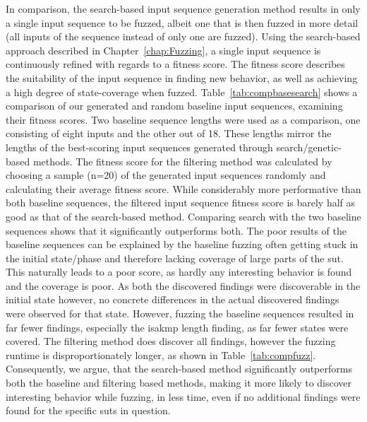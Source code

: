 In comparison, the search-based input sequence generation method results in only a single input sequence to be fuzzed, albeit one that is then fuzzed in more detail (all inputs of the sequence instead of only one are fuzzed). Using the search-based approach described in Chapter~\ref{chap:Fuzzing}, a single input sequence is continuously refined with regards to a fitness score. The fitness score describes the suitability of the input sequence in finding new behavior, as well as achieving a high degree of state-coverage when fuzzed. Table~\ref{tab:compbasesearch} shows a comparison of our generated and random baseline input sequences, examining their fitness scores. Two baseline sequence lengths were used as a comparison, one consisting of eight inputs and the other out of 18. These lengths mirror the lengths of the best-scoring input sequences generated through search/genetic-based methods. The fitness score for the filtering method was calculated by choosing a sample (n=20) of the generated input sequences randomly and calculating their average fitness score. While considerably more performative than both baseline sequences, the filtered input sequence fitness score is barely half as good as that of the search-based method. Comparing search with the two baseline sequences shows that it significantly outperforms both. The poor results of the baseline sequences can be explained by the baseline fuzzing often getting stuck in the initial state/phase and therefore lacking coverage of large parts of the \ac{sut}. This naturally leads to a poor score, as hardly any interesting behavior is found and the coverage is poor. As both the discovered findings were discoverable in the initial state however, no concrete differences in the actual discovered findings were observed for that state. However, fuzzing the baseline sequences resulted in far fewer findings, especially the \ac{isakmp} length finding, as far fewer states were covered. The filtering method does discover all findings, however the fuzzing runtime is disproportionately longer, as shown in Table~\ref{tab:compfuzz}. Consequently, we argue, that the search-based method significantly outperforms both the baseline and filtering based methods, making it more likely to discover interesting behavior while fuzzing, in less time, even if no additional findings were found for the specific \acp{sut} in question.

